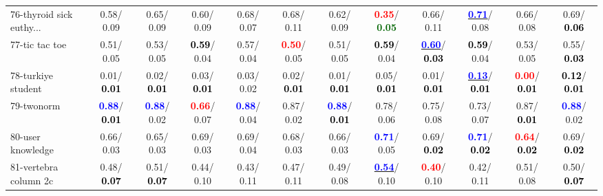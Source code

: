 \begin{table}[h]
\begin{center}
{\begin{tabular}{lc|c|c|c|c|c|c|c|c|c|c}
76-thyroid sick euthy... &   0.58/  0.09 &   0.65/  0.09 &   0.60/  0.09 &   0.68/  0.07 &   0.68/  0.11 &   0.62/  0.09 & \textcolor{red}{\textbf{  0.35}}/\textcolor{darkgreen}{\textbf{  0.05}} &   0.66/  0.11 & \underline{\textcolor{blue}{\textbf{  0.71}}}/  0.08 &   0.66/  0.08 &   0.69/\textcolor{black}{\textbf{  0.06}} \\
77-tic tac toe &   0.51/  0.05 &   0.53/  0.05 & \textcolor{black}{\textbf{  0.59}}/  0.04 &   0.57/  0.04 & \textcolor{red}{\textbf{  0.50}}/  0.05 &   0.51/  0.05 & \textcolor{black}{\textbf{  0.59}}/  0.04 & \underline{\textcolor{blue}{\textbf{  0.60}}}/\textcolor{black}{\textbf{  0.03}} & \textcolor{black}{\textbf{  0.59}}/  0.04 &   0.53/  0.05 &   0.55/\textcolor{black}{\textbf{  0.03}} \\
78-turkiye student &   0.01/\textcolor{black}{\textbf{  0.01}} &   0.02/\textcolor{black}{\textbf{  0.01}} &   0.03/\textcolor{black}{\textbf{  0.01}} &   0.03/  0.02 &   0.02/\textcolor{black}{\textbf{  0.01}} &   0.01/\textcolor{black}{\textbf{  0.01}} &   0.05/\textcolor{black}{\textbf{  0.01}} &   0.01/\textcolor{black}{\textbf{  0.01}} & \underline{\textcolor{blue}{\textbf{  0.13}}}/\textcolor{black}{\textbf{  0.01}} & \textcolor{red}{\textbf{  0.00}}/\textcolor{black}{\textbf{  0.01}} & \textcolor{black}{\textbf{  0.12}}/\textcolor{black}{\textbf{  0.01}} \\ \hline
79-twonorm & \textcolor{blue}{\textbf{  0.88}}/\textcolor{black}{\textbf{  0.01}} & \textcolor{blue}{\textbf{  0.88}}/  0.02 & \textcolor{red}{\textbf{  0.66}}/  0.07 & \textcolor{blue}{\textbf{  0.88}}/  0.04 &   0.87/  0.02 & \textcolor{blue}{\textbf{  0.88}}/\textcolor{black}{\textbf{  0.01}} &   0.78/  0.06 &   0.75/  0.08 &   0.73/  0.07 &   0.87/\textcolor{black}{\textbf{  0.01}} & \textcolor{blue}{\textbf{  0.88}}/  0.02 \\
80-user knowledge &   0.66/  0.03 &   0.65/  0.03 &   0.69/  0.03 &   0.69/  0.04 &   0.68/  0.03 &   0.66/  0.03 & \textcolor{blue}{\textbf{  0.71}}/  0.05 &   0.69/\textcolor{black}{\textbf{  0.02}} & \textcolor{blue}{\textbf{  0.71}}/\textcolor{black}{\textbf{  0.02}} & \textcolor{red}{\textbf{  0.64}}/\textcolor{black}{\textbf{  0.02}} &   0.69/\textcolor{black}{\textbf{  0.02}} \\
81-vertebra column 2c &   0.48/\textcolor{black}{\textbf{  0.07}} &   0.51/\textcolor{black}{\textbf{  0.07}} &   0.44/  0.10 &   0.43/  0.11 &   0.47/  0.11 &   0.49/  0.08 & \underline{\textcolor{blue}{\textbf{  0.54}}}/  0.10 & \textcolor{red}{\textbf{  0.40}}/  0.10 &   0.42/  0.11 &   0.51/  0.08 &   0.50/\textcolor{black}{\textbf{  0.07}} \\

\end{tabular}}
\end{center}
\end{table}
